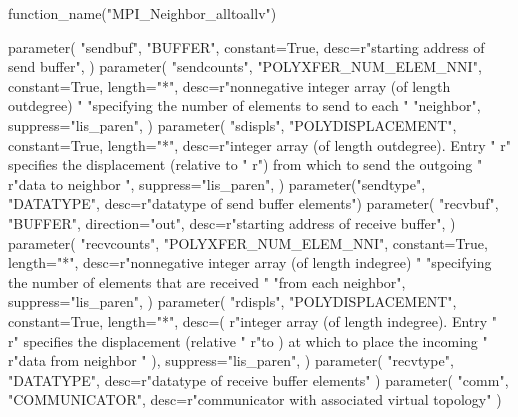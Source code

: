 \begin{mpi-binding}
    function_name("MPI_Neighbor_alltoallv")
    
    parameter(
        "sendbuf",
        "BUFFER",
        constant=True,
        desc=r"starting address of send buffer",
    )
    parameter(
        "sendcounts",
        "POLYXFER_NUM_ELEM_NNI",
        constant=True,
        length="*",
        desc=r"nonnegative integer array (of length outdegree) "
        "specifying the number of elements to send to each "
        "neighbor",
        suppress="lis_paren",
    )
    parameter(
        "sdispls",
        "POLYDISPLACEMENT",
        constant=True,
        length="*",
        desc=r"integer array (of length outdegree). Entry "
        r" specifies the displacement (relative to "
        r") from which to send the outgoing "
        r"data to neighbor ",
        suppress="lis_paren",
    )
    parameter("sendtype", "DATATYPE", desc=r"datatype of send buffer elements")
    parameter(
        "recvbuf",
        "BUFFER",
        direction="out",
        desc=r"starting address of receive buffer",
    )
    parameter(
        "recvcounts",
        "POLYXFER_NUM_ELEM_NNI",
        constant=True,
        length="*",
        desc=r"nonnegative integer array (of length indegree) "
        "specifying the number of elements that are received "
        "from each neighbor",
        suppress="lis_paren",
    )
    parameter(
        "rdispls",
        "POLYDISPLACEMENT",
        constant=True,
        length="*",
        desc=(
            r"integer array (of length indegree). Entry "
            r" specifies the displacement (relative "
            r"to ) at which to place the incoming "
            r"data from neighbor "
        ),
        suppress="lis_paren",
    )
    parameter(
        "recvtype", "DATATYPE", desc=r"datatype of receive buffer elements"
    )
    parameter(
        "comm", "COMMUNICATOR", desc=r"communicator with associated virtual topology"
    )
\end{mpi-binding}

